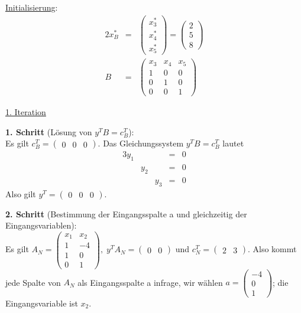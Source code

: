 \documentclass[10pt,a4paper,oneside,ngerman,numbers=noenddot]{scrartcl}
\begin{document}
		\underline{Initialisierung}:
		\begin{alignat*}{2}
			x_{B}^{*} &=& \begin{pmatrix}
				x_{3}^{*} \\
				x_{4}^{*} \\
				x_{5}^{*}
			\end{pmatrix}
			=
			\begin{pmatrix}
				2 \\
				5 \\
				8
			\end{pmatrix} \\
			B &=& \begin{pmatrix}
				x_{3} & x_{4} & x_{5} \\
				1 & 0 & 0 \\
				0 & 1 & 0 \\
				0 & 0 & 1
			\end{pmatrix}
		\end{alignat*}
		
		\underline{1. Iteration}
		
		\textbf{1. Schritt} (Lösung von $y^{T}B = c_{B}^{T}$):\\
		Es gilt $c_{B}^{T} = \begin{pmatrix} 0 & 0 & 0 \end{pmatrix}$. Das Gleichungssystem $y^{T}B = c_{B}^{T}$ lautet
		\begin{alignat*}{3}
			y_{1} & & &=& 0 \\
			& y_{2} & &=& 0 \\
			& & y_{3} &=& 0
		\end{alignat*}
		Also gilt $y^{T} = \begin{pmatrix} 0 & 0 & 0 \end{pmatrix}$.
		
		\textbf{2. Schritt} (Bestimmung der Eingangsspalte a und gleichzeitig der Eingangsvariablen):\\
		Es gilt $A_{N} = \begin{pmatrix} x_{1} & x_{2} \\ 1 & -4 \\ 1 & 0 \\ 0 & 1 \end{pmatrix},\; y^{T}A_{N} = \begin{pmatrix} 0 & 0 \end{pmatrix}$ und $c_{N}^{T} = \begin{pmatrix} 2 & 3 \end{pmatrix}$. Also kommt jede Spalte von $A_{N}$ als Eingangsspalte a infrage, wir wählen $a = \begin{pmatrix} -4 \\ 0 \\ 1 \end{pmatrix}$; die Eingangsvariable ist $x_{2}$.
		
\end{document}
